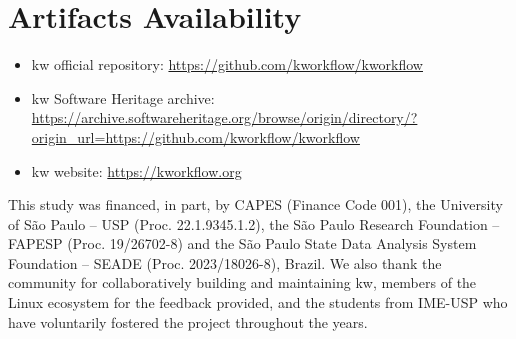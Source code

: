 \documentclass[sigconf]{acmart} %
\begin{document}





\section*{Artifacts Availability}

\begin{itemize}
  \item kw official repository: \url{https://github.com/kworkflow/kworkflow}
  \item kw Software Heritage archive: \url{https://archive.softwareheritage.org/browse/origin/directory/?origin_url=https://github.com/kworkflow/kworkflow}
  \item kw website: \url{https://kworkflow.org}

\end{itemize}

\begin{acks}
  This study was financed, in part, by CAPES (Finance Code 001), the University of São Paulo – USP (Proc. 22.1.9345.1.2), the São Paulo Research Foundation – FAPESP (Proc. 19/26702-8) and the São Paulo State Data Analysis System Foundation – SEADE (Proc. 2023/18026-8), Brazil. We also thank the community for collaboratively building and maintaining kw, members of the Linux ecosystem for the feedback provided, and the students from IME-USP who have voluntarily fostered the project throughout the years.
\end{acks}



\end{document}
